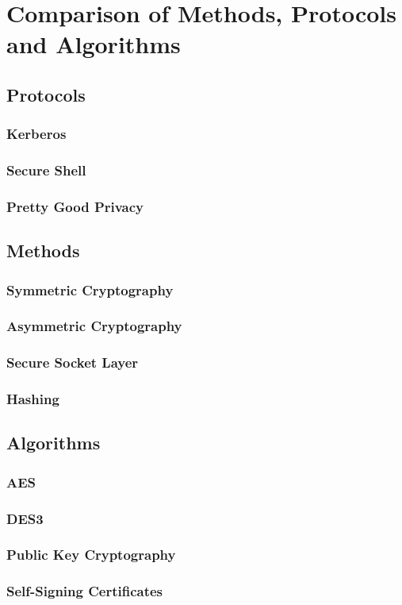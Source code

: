 \chapter{Comparison of Methods, Protocols and Algorithms}

\section{Protocols}

\subsection{Kerberos}
\subsection{Secure Shell}
\subsection{Pretty Good Privacy}

\section{Methods}

\subsection{Symmetric Cryptography}
\subsection{Asymmetric Cryptography}
\subsection{Secure Socket Layer}
\subsection{Hashing}

\section{Algorithms}

\subsection{AES}
\subsection{DES3}
\subsection{Public Key Cryptography}
\subsection{Self-Signing Certificates}